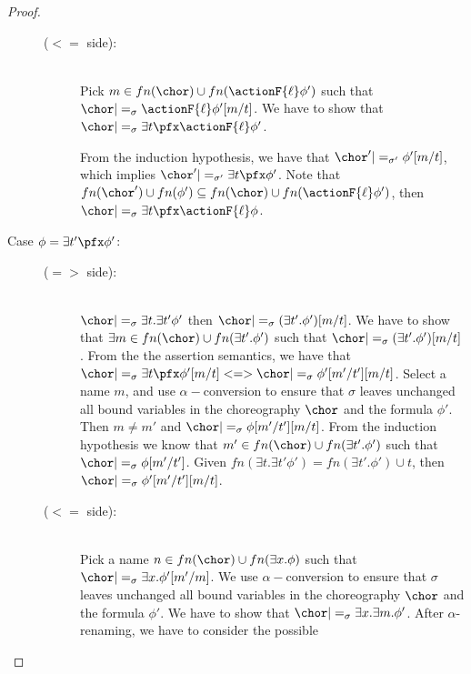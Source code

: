 \begin{proof}
\begin{description}
\begin{description}
            \item[($<=$ side):] \hfill\\
              Pick $m \in fn(\chor) \cup fn(\actionF{\ell} \phi')$
              such that $\chor |=_\sigma \actionF{\ell}
              \phi'[m/t]$. We have to show that $\chor |=_\sigma
              \exists t \pfx \actionF{\ell} \phi'$.

              From the induction hypothesis, we have that $\chor'
              |=_{\sigma'} \phi'[m/t]$, which implies $\chor'
              |=_{\sigma'} \exists t \pfx \phi'$. Note that
              $fn(\chor') \cup fn(\phi') \subseteq fn(\chor) \cup
              fn(\actionF{\ell} \phi')$, then $\chor |=_\sigma \exists
              t \pfx \actionF{\ell} \phi$.
          \end{description}
        \item[Case $\phi = \exists t' \pfx \phi' $:] \hfill 
        \begin{description}
          \item[($=>$ side):] \hfill \\
            $\chor |=_\sigma \exists t. \exists t' \phi'$ then $\chor
            |=_\sigma (\exists t'. \phi')[m/t]$. We have to show that
            $\exists m \in fn(\chor) \cup fn(\exists t'. \phi')$ such
            that $\chor |=_\sigma (\exists t'. \phi')[m/t]$. From the
            the assertion semantics, we have that $\chor
            |=_\sigma \exists t \pfx \phi'[m/t] <=> \chor |=_\sigma \phi'[m'/t'][m/t]$. Select a name $m$, and use $\alpha-$conversion to
            ensure that $\sigma$ leaves unchanged all bound variables
            in the choreography $\chor$ and the formula $\phi'$.  Then $m \neq m'$ and
            $\chor |=_\sigma \phi[m'/t'][m/t]$. From the induction
            hypothesis we know that $m' \in fn(\chor) \cup fn(\exists
            t'. \phi')$ such that $\chor |=_\sigma \phi[m'/t']$. Given
            $fn(\exists t. \exists t' \phi') = fn(\exists t'. \phi')
            \cup t$, then $\chor |=_\sigma \phi'[m'/t'][m/t]$.
            \item[($<=$ side):] \hfill\\
              Pick a name $n \in fn(\chor) \cup fn(\exists x. \phi)$
              such that $\chor |=_\sigma \exists x . \phi'[m'/m]$. We use $\alpha-$conversion to
            ensure that $\sigma$ leaves unchanged all bound variables
            in the choreography $\chor$ and the formula $\phi'$.  We have to show that $\chor |=_\sigma \exists
              x. \exists m. \phi'$. After $\alpha$-renaming, we have to consider the possible

\end{description}
\end{description}
\end{proof}
